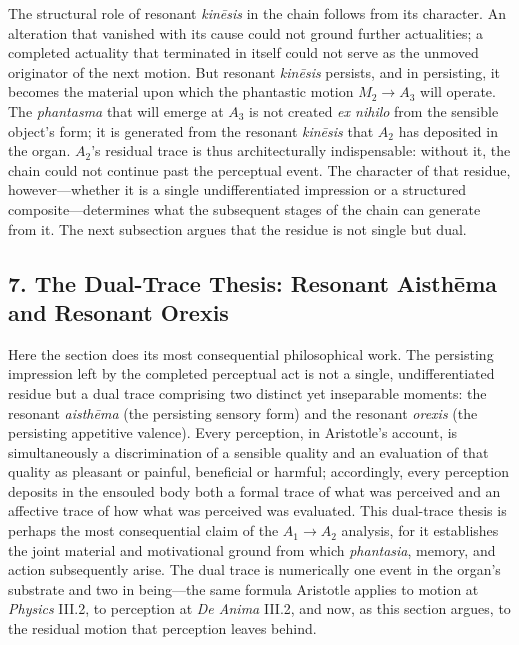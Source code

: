 \documentclass[12pt]{article}
\begin{document}
The structural role of resonant \textit{kinēsis} in the chain follows from its character. An alteration that vanished with its cause could not ground further actualities; a completed actuality that terminated in itself could not serve as the unmoved originator of the next motion. But resonant \textit{kinēsis} persists, and in persisting, it becomes the material upon which the phantastic motion $M_2 \to A_3$ will operate. The \textit{phantasma} that will emerge at $A_3$ is not created \textit{ex nihilo} from the sensible object's form; it is generated from the resonant \textit{kinēsis} that $A_2$ has deposited in the organ. $A_2$'s residual trace is thus architecturally indispensable: without it, the chain could not continue past the perceptual event. The character of that residue, however---whether it is a single undifferentiated impression or a structured composite---determines what the subsequent stages of the chain can generate from it. The next subsection argues that the residue is not single but dual.

\subsection*{7. The Dual-Trace Thesis: Resonant Aisthēma and Resonant Orexis}

Here the section does its most consequential philosophical work. The persisting impression left by the completed perceptual act is not a single, undifferentiated residue but a dual trace comprising two distinct yet inseparable moments: the resonant \textit{aisthēma} (the persisting sensory form) and the resonant \textit{orexis} (the persisting appetitive valence). Every perception, in Aristotle's account, is simultaneously a discrimination of a sensible quality and an evaluation of that quality as pleasant or painful, beneficial or harmful; accordingly, every perception deposits in the ensouled body both a formal trace of what was perceived and an affective trace of how what was perceived was evaluated. This dual-trace thesis is perhaps the most consequential claim of the $A_1 \to A_2$ analysis, for it establishes the joint material and motivational ground from which \textit{phantasia}, memory, and action subsequently arise. The dual trace is numerically one event in the organ's substrate and two in being---the same formula Aristotle applies to motion at \textit{Physics} III.2, to perception at \textit{De Anima} III.2, and now, as this section argues, to the residual motion that perception leaves behind.
\end{document}
